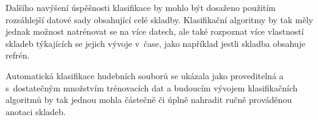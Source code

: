 Dalšího navýšení úspěšnosti klasifikace by mohlo být dosaženo použitím rozsáhlejší datové sady obsahující celé skladby. Klasifikační algoritmy by tak měly jednak možnost natrénovat se na více datech, ale také rozpoznat více vlastností skladeb týkajících se jejich vývoje v~čase, jako například jestli skladba obsahuje refrén.

Automatická klasifikace hudebních souborů se ukázala jako proveditelná a s~dostatečným množstvím trénovacích dat a budoucím vývojem klasifikačních algoritmů by tak jednou mohla částečně či úplně nahradit ručně prováděnou anotaci skladeb.

